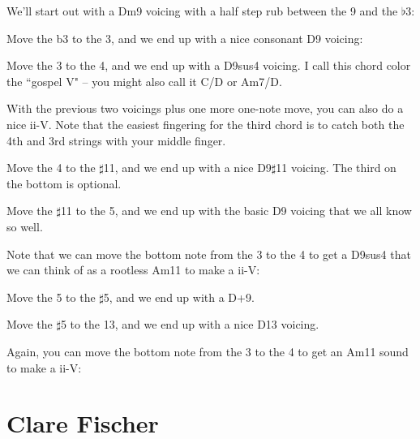 We'll start out with a Dm9 voicing with a half step rub between the 9 and the $\flat$3:


Move the b3 to the 3, and we end up with a nice consonant D9 voicing:


Move the 3 to the 4, and we end up with a D9sus4 voicing.  I call this chord color the ``gospel V" -- you might also call it C/D or Am7/D.


With the previous two voicings plus one more one-note move, you can also do a nice ii-V.  Note that the easiest fingering for the third chord is to catch both the 4th and 3rd strings with your middle finger.


Move the 4 to the $\sharp$11, and we end up with a nice D9$\sharp$11 voicing.  The third on the bottom is optional.


Move the $\sharp$11 to the 5, and we end up with the basic D9 voicing that we all know so well.


Note that we can move the bottom note from the 3 to the 4 to get a D9sus4 that we can think of as a rootless Am11 to make a ii-V:


Move the 5 to the $\sharp$5, and we end up with a D+9.


Move the $\sharp$5 to the 13, and we end up with a nice D13 voicing.


Again, you can move the bottom note from the 3 to the 4 to get an Am11 sound to make a ii-V:


\section{Clare Fischer}

